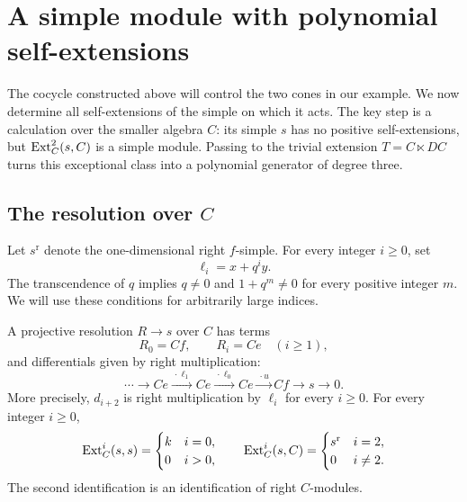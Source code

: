 \section{A simple module with polynomial self-extensions}
\label{res:section}

The cocycle constructed above will control the two cones in our example.
We now determine all self-extensions of the simple on which it acts.
The key step is a calculation over the smaller algebra $C$: its simple $s$
has no positive self-extensions, but $\operatorname{Ext}_C^2(s,C)$ is a simple module.
Passing to the trivial extension $T=C\ltimes DC$ turns this exceptional
class into a polynomial generator of degree three.

\subsection{The resolution over \texorpdfstring{$C$}{C}}

Let $s^{\mathrm r}$ denote the one-dimensional right $f$-simple.
For every integer $i\geq0$, set
\[
 \ell_i=x+q^i y.
\]
The transcendence of $q$ implies $q\ne0$ and $1+q^m\ne0$ for every
positive integer $m$. We will use these conditions for arbitrarily large
indices.

\begin{lemma}\label{res:base}
A projective resolution $R\to s$ over $C$ has terms
\[
 R_0=Cf,\qquad R_i=Ce\quad(i\geq1),
\]
and differentials given by right multiplication:
\[
 \cdots\longrightarrow Ce
 \xrightarrow{\,\cdot\ell_1\,}Ce
 \xrightarrow{\,\cdot\ell_0\,}Ce
 \xrightarrow{\,\cdot u\,}Cf\longrightarrow s\longrightarrow0.
\]
More precisely, $d_{i+2}$ is right multiplication by $\ell_i$ for every
$i\geq0$. For every integer $i\geq0$,
\[
 \operatorname{Ext}_C^i(s,s)=
 \begin{cases}k&i=0,\\0&i>0,\end{cases}
 \qquad
 \operatorname{Ext}_C^i(s,C)=
 \begin{cases}s^{\mathrm r}&i=2,\\0&i\ne2.\end{cases}
\]
The second identification is an identification of right $C$-modules.
\end{lemma}


